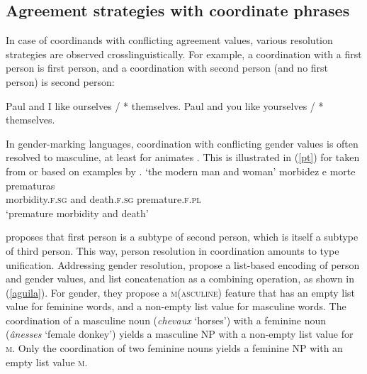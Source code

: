 \subsection{Agreement strategies with coordinate phrases}
\label{coordination:sec-agreement-with-coordinate-phrases}

In case of coordinands with conflicting agreement values, various resolution strategies are observed 
crosslinguistically. For example, a coordination with a first person is first person, and a coordination with second person (and no first person) is second person:

\eal
\ex Paul and I like ourselves / * themselves.
\ex Paul and you like yourselves / * themselves.
\zl

In gender-marking languages, coordination with conflicting gender values is often resolved to
masculine, at least for animates \citep[186]{Corbet91}. This is illustrated in (\ref{pt}) for
 taken from or based on examples by \citet*{Villavicencio:Sadler:ea:05}. 
\eal
\label{pt}
\ex 
{}
\glt `the modern man and woman'
\ex 
\gll morbidez e morte prematuras\footnotemark\\
     morbidity.\textsc{f.sg} and death.\textsc{f.sg} premature.\textsc{f.pl}\\
\glt `premature morbidity and death'\\
\zl

\noindent
\citet[]{Sag:03} proposes that first person is a subtype of second person, which is itself a subtype of third person. This way, person resolution in coordination amounts to type unification. Addressing gender resolution, \citet{Aguila:Crysmann:18} propose a list-based encoding of person and gender values, and list concatenation as a combining operation, as shown in (\ref{aguila}). For gender, they propose a \textsc{m}(\textsc{asculine}) feature that has an empty list value for feminine words, and a non-empty list value for masculine words.  The coordination of a masculine noun (\emph{chevaux} `horses') with a feminine noun (\emph{\^{a}nesses} `female donkey')  yields a masculine NP with a non-empty list value for \textsc{m}. Only the coordination of two feminine nouns yields a feminine NP with an empty list value \textsc{m}.
 
